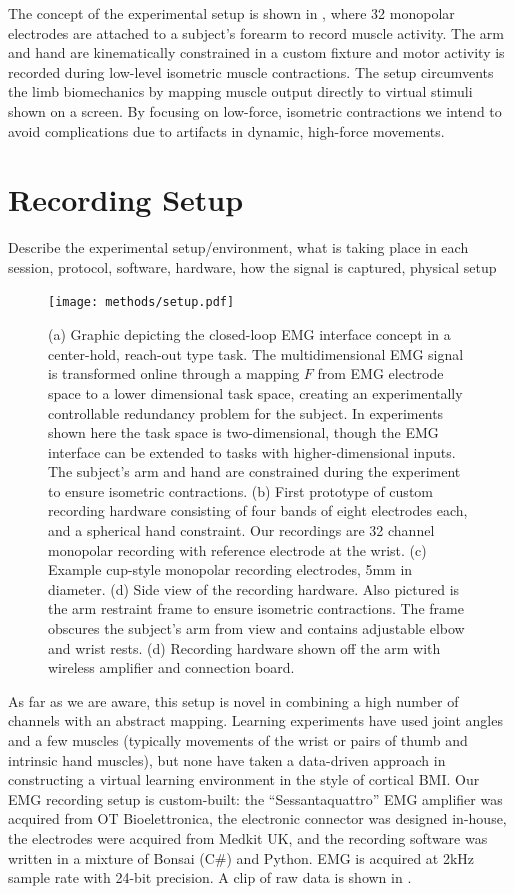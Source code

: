 \documentclass[../main.tex]{subfiles}
\begin{document}
The concept of the experimental setup is shown in , where 32 monopolar electrodes are attached to a subject's forearm to record muscle activity. The arm and hand are kinematically constrained in a custom fixture and motor activity is recorded during low-level isometric muscle contractions. The setup circumvents the limb biomechanics by mapping muscle output directly to virtual stimuli shown on a screen. By focusing on low-force, isometric contractions we intend to avoid complications due to artifacts in dynamic, high-force movements.


\section{Recording Setup}\label{hardware}

Describe the experimental setup/environment, what is taking place in each session, protocol, software, hardware, how the signal is captured, physical setup


\begin{figure}
\centering
\texttt{[image: methods/setup.pdf]}
\caption{(a) Graphic depicting the closed-loop EMG interface concept in a center-hold, reach-out type task. The multidimensional EMG signal is transformed online through a mapping $F$ from EMG electrode space to a lower dimensional task space, creating an experimentally controllable redundancy problem for the subject. In experiments shown here the task space is two-dimensional, though the EMG interface can be extended to tasks with higher-dimensional inputs. The subject's arm and hand are constrained during the experiment to ensure isometric contractions. (b) First prototype of custom recording hardware consisting of four bands of eight electrodes each, and a spherical hand constraint. Our recordings are 32 channel monopolar recording with reference electrode at the wrist. (c) Example cup-style monopolar recording electrodes, 5mm in diameter. (d) Side view of the recording hardware. Also pictured is the arm restraint frame to ensure isometric contractions. The frame obscures the subject's arm from view and contains adjustable elbow and wrist rests. (d) Recording hardware shown off the arm with wireless amplifier and connection board.}\label{fig:setup}
\end{figure}

As far as we are aware, this setup is novel in combining a high number of channels with an abstract mapping. Learning experiments have used joint angles and a few muscles (typically movements of the wrist or pairs of thumb and intrinsic hand muscles), but none have taken a data-driven approach in constructing a virtual learning environment in the style of cortical BMI\cite{@BergerDifferencesInAdaptationRates2013a;@Dyson2018;@radhakrishnanLearningNovelMyoelectricControlled2008;@Gallego2017}. Our EMG recording setup is custom-built: the ``Sessantaquattro'' EMG amplifier was acquired from OT Bioelettronica, the electronic connector was designed in-house, the electrodes were acquired from Medkit UK, and the recording software was written in a mixture of Bonsai (C\#) and Python. EMG is acquired at 2kHz sample rate with 24-bit precision. A clip of raw data is shown in .
\end{document}
